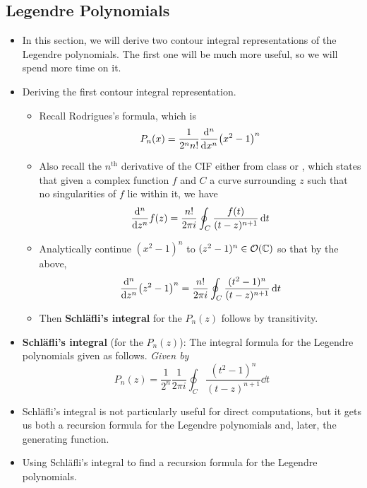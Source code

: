 \documentclass[../finalProject.tex]{subfiles}
\begin{document}
\subsection{Legendre Polynomials}
\begin{itemize}
    \item In this section, we will derive two contour integral representations of the Legendre polynomials. The first one will be much more useful, so we will spend more time on it.
    \item Deriving the first contour integral representation.
    \begin{itemize}
        \item Recall Rodrigues's formula, which is
        \begin{equation*}
            P_n(x) = \frac{1}{2^nn!}\dv[n]{x}(x^2-1)^n
        \end{equation*}
        \item Also recall the $n^\text{th}$ derivative of the CIF either from class or \textcite{bib:Seaborn}, which states that given a complex function $f$ and $C$ a curve surrounding $z$ such that no singularities of $f$ lie within it, we have
        \begin{equation*}
            \dv[n]{z}f(z) = \frac{n!}{2\pi i}\oint_C\frac{f(t)}{(t-z)^{n+1}}\dd{t}
        \end{equation*}
        \item Analytically continue $(x^2-1)^n$ to $(z^2-1)^n\in\mathcal{O}(\mathbb{C})$ so that by the above,
        \begin{equation*}
            \dv[n]{z}(z^2-1)^n = \frac{n!}{2\pi i}\oint_C\frac{(t^2-1)^n}{(t-z)^{n+1}}\dd{t}
        \end{equation*}
        \item Then \textbf{Schl\"{a}fli's integral} for the $P_n(z)$ follows by transitivity.
    \end{itemize}
    \item \textbf{Schl\"{a}fli's integral} (for the $P_n(z)$): The integral formula for the Legendre polynomials given as follows. \emph{Given by}
    \begin{equation*}
        P_n(z) = \frac{1}{2^n}\frac{1}{2\pi i}\oint_C\frac{(t^2-1)^n}{(t-z)^{n+1}}\dd{t}
    \end{equation*}
    \item Schl\"{a}fli's integral is not particularly useful for direct computations, but it gets us both a recursion formula for the Legendre polynomials and, later, the generating function.
    \item Using Schl\"{a}fli's integral to find a recursion formula for the Legendre polynomials.

\end{itemize}
\end{document}
